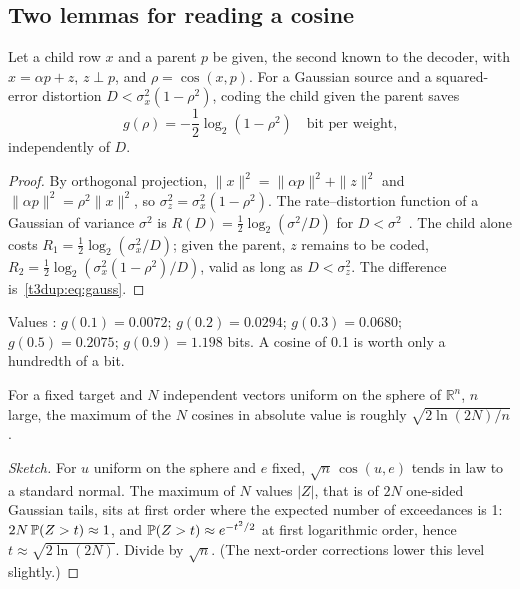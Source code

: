 \subsection{Two lemmas for reading a cosine}

\begin{lemme}\label{t3dup:lem:gauss}
Let a child row $x$ and a parent $p$ be given, the second known to the decoder, with $x = \alpha p + z$, $z \perp p$, and $\rho = \cos(x, p)$. For a Gaussian source and a squared-error distortion $D < \sigma_x^2 (1 - \rho^2)$, coding the child given the parent saves
\begin{equation}\label{t3dup:eq:gauss}
g(\rho) = -\frac12 \log_2 (1 - \rho^2) \quad \text{bit per weight,}
\end{equation}
independently of $D$.
\end{lemme}

\begin{proof}
By orthogonal projection, $\|x\|^2 = \|\alpha p\|^2 + \|z\|^2$ and $\|\alpha p\|^2 = \rho^2 \|x\|^2$, so $\sigma_z^2 = \sigma_x^2 (1 - \rho^2)$. The rate--distortion function of a Gaussian of variance $\sigma^2$ is $R(D) = \frac12 \log_2(\sigma^2/D)$ for $D < \sigma^2$~\cite{shannon1959}. The child alone costs $R_1 = \frac12\log_2(\sigma_x^2/D)$; given the parent, $z$ remains to be coded, $R_2 = \frac12\log_2(\sigma_x^2(1-\rho^2)/D)$, valid as long as $D < \sigma_z^2$. The difference is~\eqref{t3dup:eq:gauss}.
\end{proof}

Values \calc: $g(0.1) = 0.0072$; $g(0.2) = 0.0294$; $g(0.3) = 0.0680$; $g(0.5) = 0.2075$; $g(0.9) = 1.198$ bits. A cosine of 0.1 is worth only a hundredth of a bit.

\begin{lemme}\label{t3dup:lem:hasard}
For a fixed target and $N$ independent vectors uniform on the sphere of $\mathbb{R}^n$, $n$ large, the maximum of the $N$ cosines in absolute value is roughly $\sqrt{2\ln(2N)/n}$.
\end{lemme}

\begin{proof}[Sketch]
For $u$ uniform on the sphere and $e$ fixed, $\sqrt n\,\cos(u, e)$ tends in law to a standard normal. The maximum of $N$ values $|Z|$, that is of $2N$ one-sided Gaussian tails, sits at first order where the expected number of exceedances is 1: $2N\,\mathbb{P}(Z > t) \approx 1$, and $\mathbb{P}(Z > t) \approx e^{-t^2/2}$ at first logarithmic order, hence $t \approx \sqrt{2\ln(2N)}$. Divide by $\sqrt n$. (The next-order corrections lower this level slightly.)
\end{proof}

